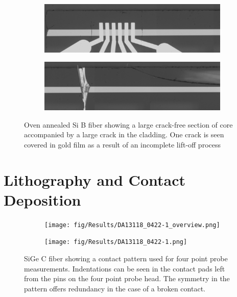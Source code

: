 \begin{figure}[h]

\begin{subfigure}{\textwidth}
  \centering
  \includegraphics[width=\linewidth]{fig/OA/e944190422_redo-dup1.jpg}
  \label{fig:sfig1}
\end{subfigure}%

\begin{subfigure}{\textwidth}
  \centering
  \includegraphics[width=\linewidth]{fig/OA/e944190422_redo-duplicate2.jpg}
  \label{fig:sfig2}
\end{subfigure}%

\caption{Oven annealed Si B fiber showing a large crack-free section of core accompanied by a large crack in the cladding. One crack is seen covered in gold film as a result of an incomplete lift-off process}
\label{fig:si_sige}
\end{figure}


\FloatBarrier
\section{Lithography and Contact Deposition}

\begin{figure}[t!]
    \begin{subfigure}{.5\textwidth}
      \centering
      \texttt{[image: fig/Results/DA13118\_0422-1\_overview.png]}
      
    \end{subfigure}%
        \begin{subfigure}{.5\textwidth}
      \centering
      \texttt{[image: fig/Results/DA13118\_0422-1.png]}
      
    \end{subfigure}%
\caption{SiGe C fiber showing a contact pattern used for four point probe measurements. Indentations can be seen in the contact pads left from the pins on the four point probe head. The symmetry in the pattern offers redundancy in the case of a broken contact.}
\label{contact overview}
\end{figure}

